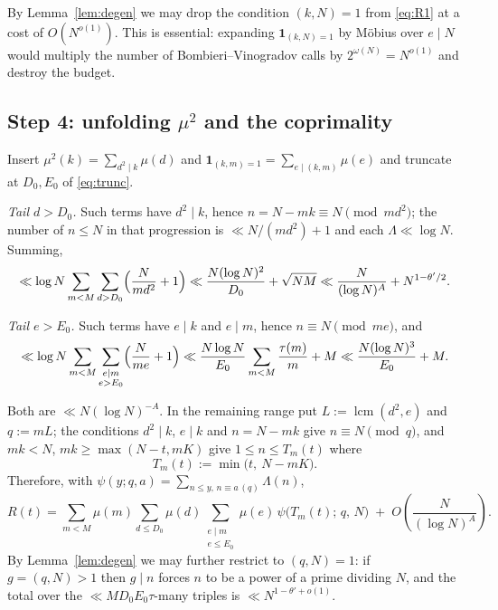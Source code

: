 \documentclass[11pt,a4paper]{article}
\theoremstyle{plain}
\theoremstyle{definition}
\DeclareMathOperator{\lcm}{lcm}
\begin{document}
By Lemma~\ref{lem:degen} we may drop the condition $(k,N)=1$ from
\eqref{eq:R1} at a cost of $O(N^{o(1)})$. This is essential: expanding
$\mathbf 1_{(k,N)=1}$ by M\"obius over $e\mid N$ would multiply the number
of Bombieri--Vinogradov calls by $2^{\omega(N)}=N^{o(1)}$ and destroy the
budget.

\subsection{Step 4: unfolding $\mu^2$ and the coprimality}

Insert $\mu^2(k)=\sum_{d^2\mid k}\mu(d)$ and
$\mathbf 1_{(k,m)=1}=\sum_{e\mid(k,m)}\mu(e)$ and truncate at $D_0,E_0$
of \eqref{eq:trunc}.

\emph{Tail $d>D_0$.} Such terms have $d^2\mid k$, hence
$n=N-mk\equiv N\pmod{md^2}$; the number of $n\le N$ in that progression
is $\ll N/(md^2)+1$ and each $\Lambda\ll\log N$. Summing,
\[
  \ll \log N\sum_{m<M}\sum_{d>D_0}\Bigl(\frac{N}{md^2}+1\Bigr)
  \ll \frac{N(\log N)^2}{D_0} + \sqrt{NM}
  \ll \frac{N}{(\log N)^{A}} + N^{1-\theta'/2}.
\]

\emph{Tail $e>E_0$.} Such terms have $e\mid k$ and $e\mid m$, hence
$n\equiv N\pmod{me}$, and
\[
  \ll \log N\sum_{m<M}\sum_{\substack{e\mid m\\ e>E_0}}
      \Bigl(\frac{N}{me}+1\Bigr)
  \ll \frac{N\log N}{E_0}\sum_{m<M}\frac{\tau(m)}{m} + M
  \ll \frac{N(\log N)^{3}}{E_0}+M .
\]

Both are $\ll N(\log N)^{-A}$. In the remaining range put
$L:=\lcm(d^2,e)$ and $q:=mL$; the conditions $d^2\mid k$, $e\mid k$ and
$n=N-mk$ give $n\equiv N\pmod q$, and $mk<N$, $mk\ge\max(N-t,mK)$ give
$1\le n\le T_m(t)$ where
\begin{equation}\label{eq:Tm}
  T_m(t) := \min\bigl(t,\ N-mK\bigr).
\end{equation}
Therefore, with $\psi(y;q,a)=\sum_{n\le y,\,n\equiv a\,(q)}\Lambda(n)$,
\begin{equation}\label{eq:R2}
  R(t) = \sum_{m<M}\mu(m)\sum_{d\le D_0}\mu(d)
         \sum_{\substack{e\mid m\\ e\le E_0}}\mu(e)\,
         \psi\bigl(T_m(t);\,q,\,N\bigr)
         \;+\;O\!\left(\frac{N}{(\log N)^{A}}\right).
\end{equation}
By Lemma~\ref{lem:degen} we may further restrict to $(q,N)=1$: if
$g=(q,N)>1$ then $g\mid n$ forces $n$ to be a power of a prime dividing
$N$, and the total over the $\ll MD_0E_0\tau$-many triples is
$\ll N^{1-\theta'+o(1)}$.
\end{document}

